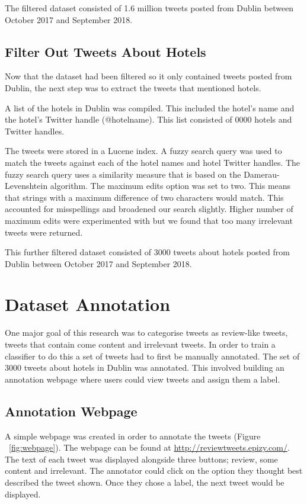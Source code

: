 The filtered dataset consisted of 1.6 million tweets posted from Dublin between October 2017 and September 2018.

\subsection*{Filter Out Tweets About Hotels}

Now that the dataset had been filtered so it only contained tweets posted from Dublin, the next step was to extract the tweets that mentioned hotels.

A list of the hotels in Dublin was compiled. This included the hotel's name and the hotel's Twitter handle (@hotelname). This list consisted of 0000 hotels and Twitter handles.

The tweets were stored in a Lucene index. A fuzzy search query was used to match the tweets against each of the hotel names and hotel Twitter handles. The fuzzy search query uses a similarity measure that is based on the Damerau-Levenshtein algorithm. The maximum edits option was set to two. This means that strings with a maximum difference of two characters would match. This accounted for misspellings and broadened our search slightly. Higher number of maximum edits were experimented with but we found that too many irrelevant tweets were returned.

This further filtered dataset consisted of 3000 tweets about hotels posted from Dublin between October 2017 and September 2018.

\section{Dataset Annotation}

One major goal of this research was to categorise tweets as review-like tweets, tweets that contain come content and irrelevant tweets. In order to train a classifier to do this a set of tweets had to first be manually annotated. The set of 3000 tweets about hotels in Dublin was annotated. This involved building an annotation webpage where users could view tweets and assign them a label.

\subsection*{Annotation Webpage}

A simple webpage was created in order to annotate the tweets (Figure ~\ref{fig:webpage}). The webpage can be found at \url{http://reviewtweets.epizy.com/}. The text of each tweet was displayed alongside three buttons; review, some content and irrelevant. The annotator could click on the option they thought best described the tweet shown. Once they chose a label, the next tweet would be displayed. 

